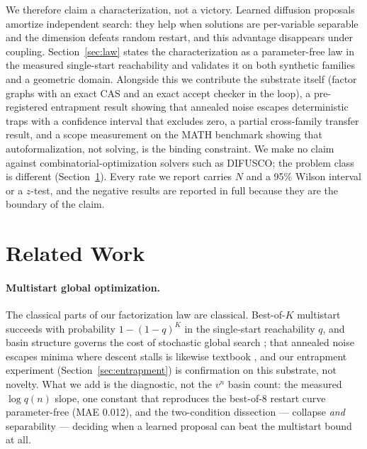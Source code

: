 \documentclass[11pt]{article}
\begin{document}
We therefore claim a characterization, not a victory. Learned diffusion proposals amortize
independent search: they help when solutions are per-variable separable and the dimension
defeats random restart, and this advantage disappears under coupling. Section~\ref{sec:law}
states the characterization as a parameter-free law in the measured single-start reachability
and validates it on both synthetic families and a geometric domain. Alongside this we
contribute the substrate itself (factor graphs with an exact CAS and an exact accept checker
in the loop), a pre-registered entrapment result showing that annealed noise escapes
deterministic traps with a confidence interval that excludes zero, a partial cross-family
transfer result, and a scope measurement on the MATH benchmark showing that autoformalization,
not solving, is the binding constraint. We make no claim against combinatorial-optimization
solvers such as DIFUSCO; the problem class is different (Section~\ref{sec:related}). Every
rate we report carries $N$ and a 95\% Wilson interval or a $z$-test, and the negative results
are reported in full because they are the boundary of the claim.

\section{Related Work}
\label{sec:related}

\paragraph{Multistart global optimization.}
The classical parts of our factorization law are classical. Best-of-$K$ multistart succeeds
with probability $1-(1-q)^K$ in the single-start reachability $q$, and basin structure governs
the cost of stochastic global search \citep{rinnooykan1987clustering,
rinnooykan1987multilevel}; that annealed noise escapes minima where descent stalls is likewise
textbook \citep{welling2011sgld, bras2021langevin, regularized2025langevin}, and our
entrapment experiment (Section~\ref{sec:entrapment}) is confirmation on this substrate, not
novelty. What we add is the diagnostic, not the $v^n$ basin count: the measured $\log q(n)$
slope, one constant that reproduces the best-of-8 restart curve parameter-free (MAE 0.012),
and the two-condition dissection --- collapse \emph{and} separability --- deciding when a
learned proposal can beat the multistart bound at all.
\end{document}
